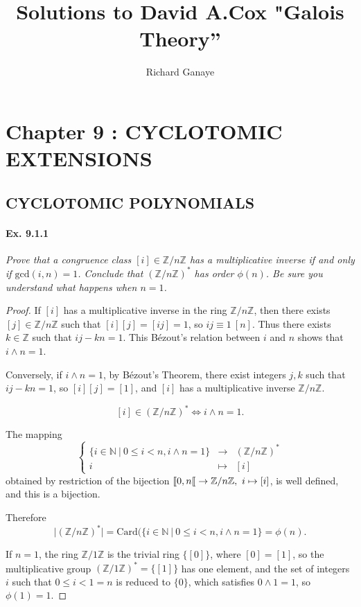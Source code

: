\documentclass[11pt,a4paper]{article}
\title{Solutions to David A.Cox  "Galois Theory''}
\author{Richard Ganaye}
\def\gcro{\mbox{[\hspace{-.15em}[}}%
\newcommand{\Z}{\mathbb{Z}}
\newcommand{\N}{\mathbb{N}}
\begin{document}
\maketitle

\section{Chapter 9 : CYCLOTOMIC EXTENSIONS}

\subsection{CYCLOTOMIC POLYNOMIALS}

\paragraph{Ex. 9.1.1}

{\it Prove that a congruence class $[i] \in \Z/n\Z$ has a multiplicative inverse if and only if $\mathrm{gcd}(i,n) = 1$. Conclude that $(\Z/n\Z)^*$ has order $\phi(n)$. Be sure you understand what happens when $n=1$.
}

\begin{proof}
If $[i]$ has a multiplicative inverse in the ring $\Z/n\Z$, then there exists $[j] \in \Z/n\Z$ such  that $[i][j] = [ij] = 1$, so $ij \equiv 1\ [n]$. Thus there exists $k\in \Z$ such that $ij - k n =1$. This B\'ezout's relation between $i$ and $n$ shows that $i\wedge n=1$.

Conversely, if $i\wedge n=1$, by  B\'ezout's Theorem, there exist integers $j,k$ such that $ij-kn=1$, so $[i] [j] = [1]$, and $[i]$ has a multiplicative inverse $\Z/n\Z$.

$$[i] \in (\Z/n\Z)^* \iff i\wedge n=1.$$

The mapping 
$$
\left\{
\begin{array}{ccc}
\{i \in \N\  \vert \ 0\leq i <n, i \wedge n = 1\} &  \to  &  (\Z/n\Z)^* \\
 i  &  \mapsto &   [i]
\end{array}
\right.
$$
obtained by restriction of the bijection $\gcro 0, n \gcro \to\Z/n\Z ,\  i \mapsto [i]$,  is well defined, and this is a bijection.

Therefore $$\vert (\Z/n\Z)^* \vert = \mathrm{Card} (\{i \in \N\  \vert \ 0\leq i <n, i \wedge n = 1\} = \phi(n).$$

If $n = 1$, the ring $\Z/1\Z$ is the trivial ring $\{[0]\}$, where $[0]=[1]$, so the multiplicative group $(\Z/1\Z)^* = \{[1]\}$ has one element, and the set of integers $i$ such that $0 \leq i < 1=n$ is reduced to $\{0\}$, which satisfies $0\wedge 1 = 1$, so $ \phi(1)=1$.
\end{proof}
\end{document}
